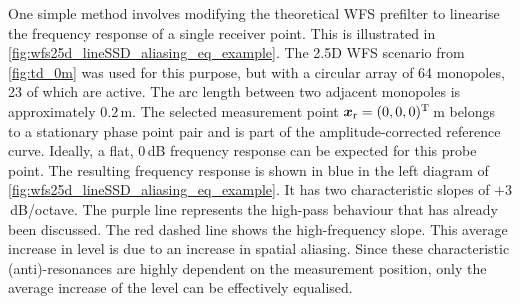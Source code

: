One simple method involves modifying the theoretical
WFS prefilter to linearise the frequency response
of a single receiver point.
%
This is illustrated in \myfig\ref{fig:wfs25d_lineSSD_aliasing_eq_example}.
%
The 2.5D WFS scenario from \myfig\ref{fig:td_0m} was
used for this purpose, but with a circular array of 64 monopoles, 23 of which
are active.
%
The arc length between two adjacent monopoles is approximately $0{.}2$\,m.
%
The selected measurement point $\bm{x}_\mathrm{r} = (0,0,0)^\mathrm{T}$\,m belongs to a
stationary phase point pair and is part of the amplitude-corrected
reference curve.
%
Ideally, a flat, $0$\,dB frequency response can be expected for
this probe point.
%
The resulting frequency response is shown in blue in the left diagram
of \myfig\ref{fig:wfs25d_lineSSD_aliasing_eq_example}.
%
It has two characteristic slopes of $+3$\,dB/octave.
%
The purple line represents the high-pass behaviour that has already
been discussed.
%
The red dashed line shows the high-frequency slope.
This average increase in level is due to an increase in spatial aliasing.
%
Since these characteristic (anti)-resonances are highly dependent
on the measurement position, only the average increase of the level
can be effectively equalised.



